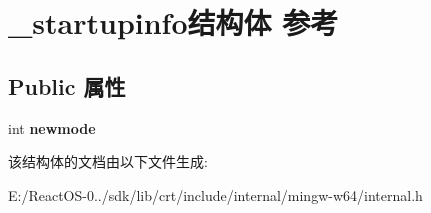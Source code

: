 \hypertarget{struct__startupinfo}{}\section{\+\_\+startupinfo结构体 参考}
\label{struct__startupinfo}
\subsection*{Public 属性}
\begin{DoxyCompactItemize}
\item 
\mbox{\label{struct__startupinfo_afabda6a1157e371b4c39cb12bdeafb84}} 
int {\bfseries newmode}
\end{DoxyCompactItemize}


该结构体的文档由以下文件生成\+:\begin{DoxyCompactItemize}
\item 
E\+:/\+React\+O\+S-\/0../sdk/lib/crt/include/internal/mingw-\/w64/internal.\+h\end{DoxyCompactItemize}
